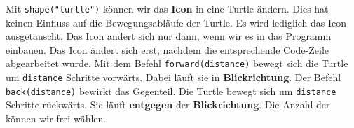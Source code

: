 \begin{figure}[htb]
{\begin{minipage}[c][4cm]{4cm}
        \end{minipage}
    }
    \hfill
\end{figure}

Mit \lstinline[language={python3}]{shape("turtle")} können wir das \textbf{Icon} in eine Turtle ändern.
Dies hat keinen Einfluss auf die Bewegungsabläufe der Turtle.
Es wird lediglich das Icon ausgetauscht.
Das Icon ändert sich nur dann, wenn wir es in das Programm einbauen.
Das Icon ändert sich erst, nachdem die entsprechende Code-Zeile abgearbeitet wurde.
Mit dem Befehl \lstinline[language={python3}]{forward(distance)} bewegt sich die Turtle um \lstinline[language={python3}]{distance} Schritte vorwärts.
Dabei läuft sie in \textbf{Blickrichtung}.
Der Befehl \lstinline[language={python3}]{back(distance)} bewirkt das Gegenteil.
Die Turtle bewegt sich um \lstinline[language={python3}]{distance} Schritte rückwärts.
Sie läuft \textbf{entgegen} der \textbf{Blickrichtung}.
Die Anzahl der  können wir frei wählen.

